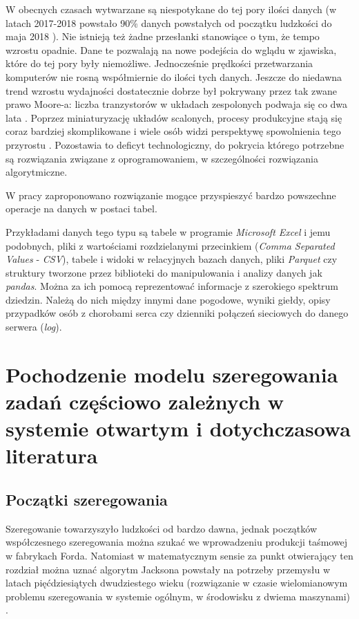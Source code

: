 \documentclass[brudnopis]{xmgr}
\begin{document}
\introduction
W obecnych czasach wytwarzane są niespotykane do tej pory ilości danych (w latach 2017-2018 powstało 90\% danych powstałych od początku ludzkości do maja 2018 \cite{Forbes:2018:FBS}).
Nie istnieją też żadne przesłanki stanowiące o tym, że tempo wzrostu opadnie.
Dane te pozwalają na nowe podejścia do wglądu w zjawiska, które do tej pory były niemożliwe.
Jednocześnie prędkości przetwarzania komputerów nie rosną współmiernie do ilości tych danych. Jeszcze do niedawna trend wzrostu wydajności dostatecznie dobrze był pokrywany przez tak zwane prawo Moore-a: liczba tranzystorów w układach zespolonych podwaja się co dwa lata \cite{MOORE:1965:X}. Poprzez miniaturyzację układów scalonych, procesy produkcyjne stają się coraz bardziej skomplikowane i wiele osób widzi perspektywę spowolnienia tego przyrostu \cite{NOTMOORE:2020:X}. Pozostawia to deficyt technologiczny, do pokrycia którego potrzebne są rozwiązania związane z oprogramowaniem, w szczególności rozwiązania algorytmiczne.
\medskip

W pracy zaproponowano rozwiązanie mogące przyspieszyć bardzo powszechne operacje na danych w postaci tabel.
\medskip

Przykładami danych tego typu są tabele w programie \emph{Microsoft Excel} i jemu podobnych, pliki z wartościami rozdzielanymi przecinkiem (\emph{Comma Separated Values} - \emph{CSV}), tabele i widoki w relacyjnych bazach danych, pliki \emph{Parquet} \cite{parquet} czy struktury tworzone przez biblioteki do manipulowania i analizy danych jak \emph{pandas}.
Można za ich pomocą reprezentować informacje z szerokiego spektrum dziedzin. Należą do nich między innymi dane pogodowe, wyniki giełdy, opisy przypadków osób z chorobami serca czy dzienniki połączeń sieciowych do danego serwera (\emph{log}).



\chapter{Pochodzenie modelu szeregowania zadań częściowo zależnych w systemie otwartym i dotychczasowa literatura}


\section{Początki szeregowania}
Szeregowanie towarzyszyło ludzkości od bardzo dawna, jednak początków współczesnego szeregowania można szukać we wprowadzeniu produkcji taśmowej w fabrykach Forda. Natomiast w matematycznym sensie za punkt otwierający ten rozdział można uznać algorytm Jacksona powstały na potrzeby przemysłu w latach pięćdziesiątych dwudziestego wieku (rozwiązanie w czasie wielomianowym problemu szeregowania w systemie ogólnym, w środowisku z dwiema maszynami) \cite{jackson1956extension}.
\medskip
\end{document}
